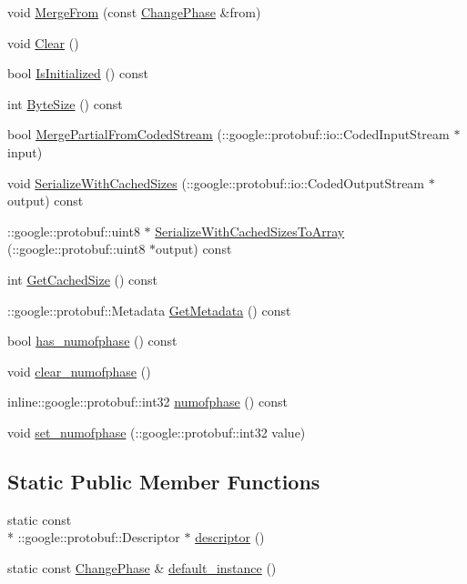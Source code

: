 \begin{DoxyCompactItemize}
void \hyperlink{class_change_phase_a980a96f372dbf4eeff624c0ae7cb8537}{Merge\-From} (const \hyperlink{class_change_phase}{Change\-Phase} \&from)
\item 
void \hyperlink{class_change_phase_ae5f1923ed41767cee32ef3475ad75ce0}{Clear} ()
\item 
bool \hyperlink{class_change_phase_a2fa641d0ce528ee22615eae08c8193cc}{Is\-Initialized} () const 
\item 
int \hyperlink{class_change_phase_adb5d0c836b47a428c7b8a8b11cc889e0}{Byte\-Size} () const 
\item 
bool \hyperlink{class_change_phase_a5cf5896de3c53cf0430b6747539fbb48}{Merge\-Partial\-From\-Coded\-Stream} (\-::google\-::protobuf\-::io\-::\-Coded\-Input\-Stream $\ast$input)
\item 
void \hyperlink{class_change_phase_aa35438674277382e3a4e5c23d477cde6}{Serialize\-With\-Cached\-Sizes} (\-::google\-::protobuf\-::io\-::\-Coded\-Output\-Stream $\ast$output) const 
\item 
\-::google\-::protobuf\-::uint8 $\ast$ \hyperlink{class_change_phase_aa7987128eb875e6387cddb886094b922}{Serialize\-With\-Cached\-Sizes\-To\-Array} (\-::google\-::protobuf\-::uint8 $\ast$output) const 
\item 
int \hyperlink{class_change_phase_a061c6426b4e079d7fe6ade662e3fcb60}{Get\-Cached\-Size} () const 
\item 
\-::google\-::protobuf\-::\-Metadata \hyperlink{class_change_phase_adf1e1f91fda84e9fcbc64a32d0442ee8}{Get\-Metadata} () const 
\item 
bool \hyperlink{class_change_phase_aebfe231080875edab422c1332fb9848c}{has\-\_\-numofphase} () const 
\item 
void \hyperlink{class_change_phase_ad0d17253d8988af5afa6f3b81235164e}{clear\-\_\-numofphase} ()
\item 
inline\-::google\-::protobuf\-::int32 \hyperlink{class_change_phase_a00b30bc0d542ab389b7b20aaae1b10bc}{numofphase} () const 
\item 
void \hyperlink{class_change_phase_a40d66346dfc6aae8de80fb5545fe8460}{set\-\_\-numofphase} (\-::google\-::protobuf\-::int32 value)
\end{DoxyCompactItemize}
\subsection*{Static Public Member Functions}
\begin{DoxyCompactItemize}
\item 
static const \\*
\-::google\-::protobuf\-::\-Descriptor $\ast$ \hyperlink{class_change_phase_abc14333ee6f01fd88840e430c202f926}{descriptor} ()
\item 
static const \hyperlink{class_change_phase}{Change\-Phase} \& \hyperlink{class_change_phase_a2a86feb8760cbad6c536e5f836ba6755}{default\-\_\-instance} ()
\end{DoxyCompactItemize}
